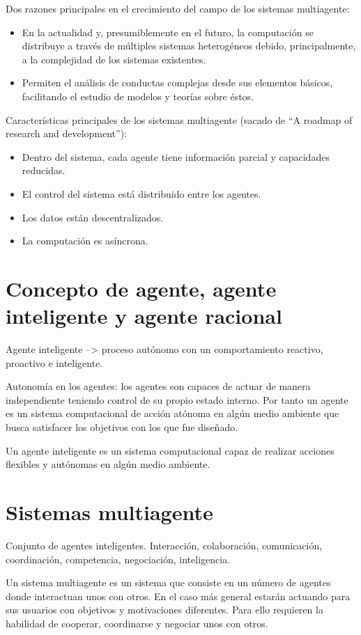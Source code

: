 Dos razones principales en el crecimiento del campo de los sistemas multiagente:

\begin{itemize}
	\item En la actualidad y, presumiblemente en el futuro, la computación se distribuye a través de múltiples sistemas heterogéneos debido, principalmente, a la complejidad de los sistemas existentes.
	\item Permiten el análisis de conductas complejas desde sus elementos básicos, facilitando el estudio de modelos y teorías sobre éstos.
\end{itemize}

Características principales de los sistemas multiagente (sacado de \enquote{A roadmap of research and development}):

\begin{itemize}
	\item Dentro del sistema, cada agente tiene información parcial y capacidades reducidas.
	\item El control del sistema está distribuido entre los agentes.
	\item Los datos están descentralizados.
	\item La computación es asíncrona.
\end{itemize}








\section{Concepto de agente, agente inteligente y agente racional}

Agente inteligente --> proceso autónomo con un comportamiento reactivo, proactivo e inteligente.

Autonomía en los agentes: los agentes son capaces de actuar de manera independiente teniendo control de su propio estado interno. Por tanto un agente es un sistema computacional de acción atónoma en algún medio ambiente que busca satisfacer los objetivos con los que fue diseñado.

Un agente inteligente es un sistema computacional capaz de realizar acciones flexibles y autónomas en algún medio ambiente.

\section{Sistemas multiagente}
\label{ch:sota-agents-and-mas:s:mas}

Conjunto de agentes inteligentes. Interacción, colaboración, comunicación, coordinación, competencia, negociación, inteligencia.

Un sistema multiagente es un sistema que consiste en un número de agentes donde interactuan unos con otros. En el caso más general estarán actuando para sus usuarios con objetivos y motivaciones diferentes. Para ello requieren la habilidad de cooperar, coordinarse y negociar unos con otros.

